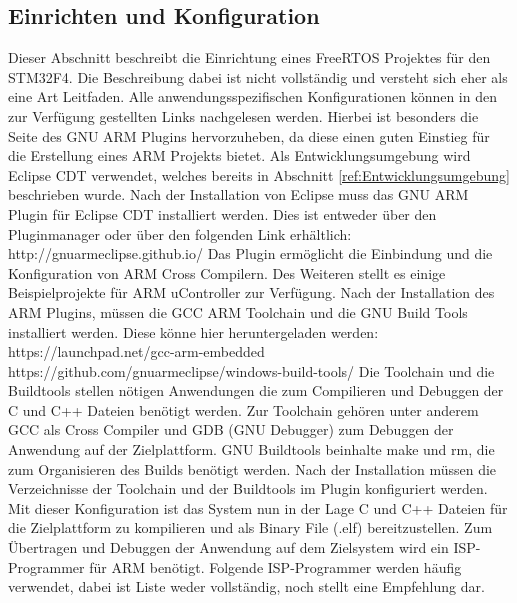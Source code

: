 \subsection{Einrichten und Konfiguration}
\label{sec:Einrichtung und Konfiguration}
Dieser Abschnitt beschreibt die Einrichtung eines FreeRTOS Projektes für den STM32F4. Die Beschreibung dabei ist nicht vollständig und versteht sich eher als eine Art Leitfaden. Alle anwendungsspezifischen Konfigurationen können in den zur Verfügung gestellten Links nachgelesen werden. Hierbei ist besonders die Seite des GNU ARM Plugins hervorzuheben, da diese einen guten Einstieg für die Erstellung eines ARM Projekts bietet. Als Entwicklungsumgebung wird Eclipse CDT verwendet, welches bereits in Abschnitt \ref{ref:Entwicklungsumgebung} beschrieben wurde. Nach der Installation von Eclipse muss das GNU ARM Plugin für Eclipse CDT installiert werden. Dies ist entweder über den Pluginmanager oder über den folgenden Link erhältlich: 
\newline
\newline
http://gnuarmeclipse.github.io/
\newline
\newline
Das Plugin ermöglicht die Einbindung und die Konfiguration von ARM Cross Compilern. Des Weiteren stellt es einige Beispielprojekte für ARM uController zur Verfügung. Nach der Installation des ARM Plugins, müssen die GCC ARM Toolchain und die GNU Build Tools installiert werden. 
Diese könne hier heruntergeladen werden: 
\newline
\newline
https://launchpad.net/gcc-arm-embedded
\newline
https://github.com/gnuarmeclipse/windows-build-tools/
\newline
\newline
Die Toolchain und die Buildtools stellen nötigen Anwendungen die zum Compilieren und Debuggen der C und C++ Dateien benötigt werden. Zur Toolchain gehören unter anderem GCC als Cross Compiler und GDB (GNU Debugger) zum Debuggen der Anwendung auf der Zielplattform. GNU Buildtools beinhalte make und rm, die zum Organisieren des Builds benötigt werden. Nach der Installation müssen die Verzeichnisse der Toolchain und der Buildtools im Plugin konfiguriert werden. Mit dieser Konfiguration ist das System nun in der Lage C und C++ Dateien für die Zielplattform zu kompilieren und als Binary File (.elf) bereitzustellen. Zum Übertragen und Debuggen der Anwendung auf dem Zielsystem wird ein ISP-Programmer für ARM benötigt. Folgende ISP-Programmer werden häufig verwendet, dabei ist Liste weder vollständig, noch stellt eine Empfehlung dar.
